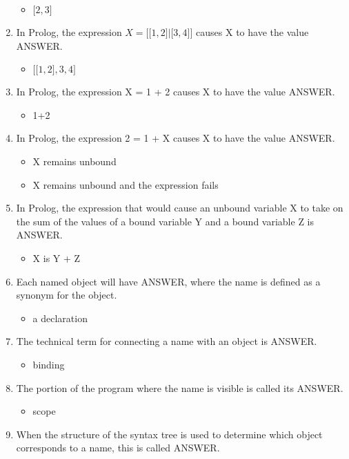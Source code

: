 \documentclass{exam}
\begin{document}
\begin{enumerate}
\begin{itemize}
\item $\lbrack 2, 3\rbrack$
\end{itemize}
\item In Prolog, the expression $X = \lbrack \lbrack 1,2\rbrack | \lbrack 3,4\rbrack \rbrack$ causes X to have the value ANSWER.
\begin{itemize}
\item $\lbrack \lbrack 1, 2\rbrack, 3, 4\rbrack$
\end{itemize}
\item In Prolog, the expression X = 1 + 2 causes X to have the value ANSWER.
\begin{itemize}
\item 1+2
\end{itemize}
\item In Prolog, the expression 2 = 1 + X causes X to have the value ANSWER.
\begin{itemize}
\item X remains unbound
\item X remains unbound and the expression fails
\end{itemize}
\item In Prolog, the expression that would cause an unbound variable X to take on the sum of the values of a bound variable Y and a bound variable Z is ANSWER.
\begin{itemize}
\item X is Y + Z
\end{itemize}
\item Each named object will have ANSWER, where the name is defined as a synonym for the object.
\begin{itemize}
\item a declaration
\end{itemize}
\item The technical term for connecting a name with an object is ANSWER.
\begin{itemize}
\item binding
\end{itemize}
\item The portion of the program where the name is visible is called its ANSWER.
\begin{itemize}
\item scope
\end{itemize}
\item When the structure of the syntax tree is used to determine which object corresponds to a name, this is called ANSWER.
\begin{itemize}

\end{itemize}
\end{enumerate}
\end{document}
